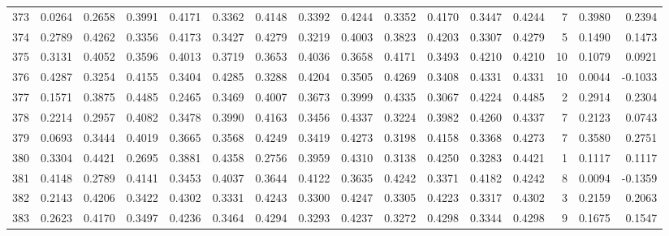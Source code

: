 \begin{tabular}{lrrrrrrrrrrrrrrr}
373 &      0.0264 &  0.2658 &  0.3991 &  0.4171 &  0.3362 &  0.4148 &  0.3392 &  0.4244 &  0.3352 &  0.4170 &   0.3447 &     0.4244 &      7 &                    0.3980 &                     0.2394 \\
374 &      0.2789 &  0.4262 &  0.3356 &  0.4173 &  0.3427 &  0.4279 &  0.3219 &  0.4003 &  0.3823 &  0.4203 &   0.3307 &     0.4279 &      5 &                    0.1490 &                     0.1473 \\
375 &      0.3131 &  0.4052 &  0.3596 &  0.4013 &  0.3719 &  0.3653 &  0.4036 &  0.3658 &  0.4171 &  0.3493 &   0.4210 &     0.4210 &     10 &                    0.1079 &                     0.0921 \\
376 &      0.4287 &  0.3254 &  0.4155 &  0.3404 &  0.4285 &  0.3288 &  0.4204 &  0.3505 &  0.4269 &  0.3408 &   0.4331 &     0.4331 &     10 &                    0.0044 &                    -0.1033 \\
377 &      0.1571 &  0.3875 &  0.4485 &  0.2465 &  0.3469 &  0.4007 &  0.3673 &  0.3999 &  0.4335 &  0.3067 &   0.4224 &     0.4485 &      2 &                    0.2914 &                     0.2304 \\
378 &      0.2214 &  0.2957 &  0.4082 &  0.3478 &  0.3990 &  0.4163 &  0.3456 &  0.4337 &  0.3224 &  0.3982 &   0.4260 &     0.4337 &      7 &                    0.2123 &                     0.0743 \\
379 &      0.0693 &  0.3444 &  0.4019 &  0.3665 &  0.3568 &  0.4249 &  0.3419 &  0.4273 &  0.3198 &  0.4158 &   0.3368 &     0.4273 &      7 &                    0.3580 &                     0.2751 \\
380 &      0.3304 &  0.4421 &  0.2695 &  0.3881 &  0.4358 &  0.2756 &  0.3959 &  0.4310 &  0.3138 &  0.4250 &   0.3283 &     0.4421 &      1 &                    0.1117 &                     0.1117 \\
381 &      0.4148 &  0.2789 &  0.4141 &  0.3453 &  0.4037 &  0.3644 &  0.4122 &  0.3635 &  0.4242 &  0.3371 &   0.4182 &     0.4242 &      8 &                    0.0094 &                    -0.1359 \\
382 &      0.2143 &  0.4206 &  0.3422 &  0.4302 &  0.3331 &  0.4243 &  0.3300 &  0.4247 &  0.3305 &  0.4223 &   0.3317 &     0.4302 &      3 &                    0.2159 &                     0.2063 \\
383 &      0.2623 &  0.4170 &  0.3497 &  0.4236 &  0.3464 &  0.4294 &  0.3293 &  0.4237 &  0.3272 &  0.4298 &   0.3344 &     0.4298 &      9 &                    0.1675 &                     0.1547 \\

\end{tabular}
